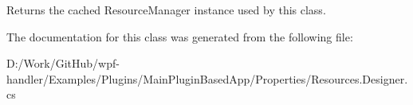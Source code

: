 Returns the cached Resource\+Manager instance used by this class. 



The documentation for this class was generated from the following file\+:\begin{DoxyCompactItemize}
\item 
D\+:/\+Work/\+Git\+Hub/wpf-\/handler/\+Examples/\+Plugins/\+Main\+Plugin\+Based\+App/\+Properties/Resources.\+Designer.\+cs\end{DoxyCompactItemize}
